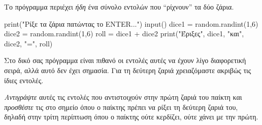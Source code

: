 \documentclass[a4paper,11pt,oneside]{book}
\begin{document}
\begin{step}
Το πρόγραμμα περιέχει \emph{ήδη} ένα σύνολο εντολών που ``ρίχνουν'' τα δύο ζάρια. 

\begin{pyplain}
print("Ρίξε τα ζάρια πατώντας το ENTER...")
input()
dice1 = random.randint(1,6)
dice2 = random.randint(1,6)
roll = dice1 + dice2
print("Έριξες", dice1, "και", dice2, "=", roll)
\end{pyplain}

Στο δικό σας πρόγραμμα είναι πιθανό οι εντολές αυτές να έχουν λίγο διαφορετική σειρά, αλλά αυτό δεν έχει σημασία. Για τη δεύτερη ζαριά χρειαζόμαστε ακριβώς τις ίδιες εντολές.

\emph{Αντιγράψτε} αυτές τις εντολές που αντιστοιχούν στην πρώτη ζαριά του παίκτη και \emph{προσθέστε} τις στο σημείο όπου ο παίκτης πρέπει να ρίξει τη δεύτερη ζαριά του, δηλαδή στην τρίτη περίπτωση όπου ο παίκτης ούτε κερδίζει, ούτε χάνει με την πρώτη.




\end{step}
\end{document}
